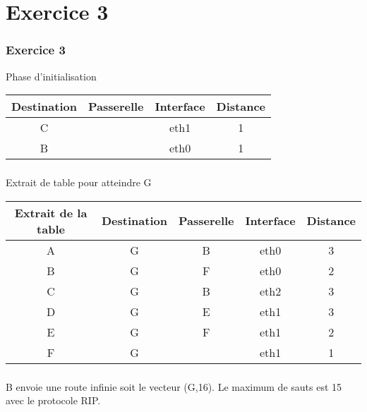 \documentclass[svgnames,11pt]{beamer}
\begin{document}
\section{Exercice 3}
\begin{frame}
    \frametitle{Exercice 3}

    Phase d'initialisation
        \begin{center}
            \begin{tabular}{|*{4}{c|}}
                \hline
                Destination & Passerelle & Interface & Distance \\
                \hline
                C & & eth1 & 1\\
                \hline
                B & & eth0 & 1\\
                \hline
            \end{tabular}
        \end{center}

\end{frame}
\begin{frame}
    \frametitle{}

    Extrait de table pour atteindre G
        \begin{center}
            \begin{tabular}{|*{5}{c|}}
                \hline
                Extrait de la table & Destination & Passerelle & Interface & Distance \\
                \hline
                A & G & B & eth0 & 3\\
                \hline
                B & G & F & eth0 & 2\\
                \hline
                C & G & B & eth2 & 3\\
                \hline
                D & G & E & eth1 & 3\\
                \hline
                E & G & F & eth1 & 2\\
                \hline
                F & G &  & eth1 & 1\\
                \hline
            \end{tabular}
        \end{center}

\end{frame}
\begin{frame}
    \frametitle{}

    B envoie une route infinie soit le vecteur (G,16). Le maximum de sauts est 15 avec le protocole RIP.

\end{frame}
\end{document}
